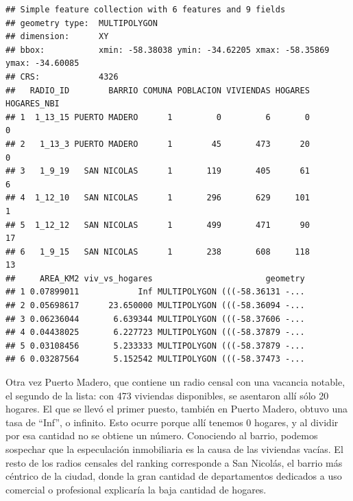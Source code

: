 \documentclass[spanish,]{book}
\newenvironment{Shaded}{\begin{snugshade}}{\end{snugshade}}
\newcommand{\DataTypeTok}[1]{\textcolor[rgb]{0.13,0.29,0.53}{#1}}
\newcommand{\KeywordTok}[1]{\textcolor[rgb]{0.13,0.29,0.53}{\textbf{#1}}}
\newcommand{\NormalTok}[1]{#1}
\newcommand{\OperatorTok}[1]{\textcolor[rgb]{0.81,0.36,0.00}{\textbf{#1}}}
\newcommand{\StringTok}[1]{\textcolor[rgb]{0.31,0.60,0.02}{#1}}
\begin{document}
\begin{Shaded}
\end{Shaded}

\begin{verbatim}
## Simple feature collection with 6 features and 9 fields
## geometry type:  MULTIPOLYGON
## dimension:      XY
## bbox:           xmin: -58.38038 ymin: -34.62205 xmax: -58.35869 ymax: -34.60085
## CRS:            4326
##   RADIO_ID        BARRIO COMUNA POBLACION VIVIENDAS HOGARES HOGARES_NBI
## 1  1_13_15 PUERTO MADERO      1         0         6       0           0
## 2   1_13_3 PUERTO MADERO      1        45       473      20           0
## 3   1_9_19   SAN NICOLAS      1       119       405      61           6
## 4  1_12_10   SAN NICOLAS      1       296       629     101           1
## 5  1_12_12   SAN NICOLAS      1       499       471      90          17
## 6   1_9_15   SAN NICOLAS      1       238       608     118          13
##     AREA_KM2 viv_vs_hogares                       geometry
## 1 0.07899011            Inf MULTIPOLYGON (((-58.36131 -...
## 2 0.05698617      23.650000 MULTIPOLYGON (((-58.36094 -...
## 3 0.06236044       6.639344 MULTIPOLYGON (((-58.37606 -...
## 4 0.04438025       6.227723 MULTIPOLYGON (((-58.37879 -...
## 5 0.03108456       5.233333 MULTIPOLYGON (((-58.37879 -...
## 6 0.03287564       5.152542 MULTIPOLYGON (((-58.37473 -...
\end{verbatim}

Otra vez Puerto Madero, que contiene un radio censal con una vacancia notable, el segundo de la lista: con 473 viviendas disponibles, se asentaron allí sólo 20 hogares. El que se llevó el primer puesto, también en Puerto Madero, obtuvo una tasa de ``Inf'', o infinito. Esto ocurre porque allí tenemos 0 hogares, y al dividir por esa cantidad no se obtiene un número. Conociendo al barrio, podemos sospechar que la especulación inmobiliaria es la causa de las viviendas vacías. El resto de los radios censales del ranking corresponde a San Nicolás, el barrio más céntrico de la ciudad, donde la gran cantidad de departamentos dedicados a uso comercial o profesional explicaría la baja cantidad de hogares.
\end{document}
